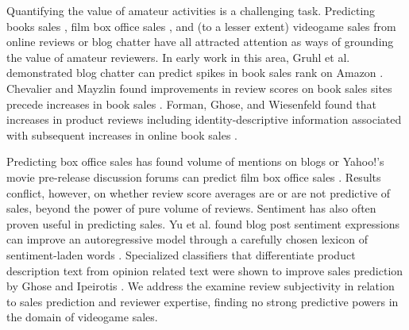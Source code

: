\documentclass{sig-alternate}
\begin{document}
Quantifying the value of amateur activities is a challenging task. 
Predicting books sales \cite{gruhl2005predictive, chevalier2003effect}, film box office sales \cite{dellarocas2007exploring, yu2012mining}, and (to a lesser extent) videogame sales \cite{ehrenfeld2011predicting, marcoux2009hybrid} from online reviews or blog chatter have all attracted attention as ways of grounding the value of amateur reviewers. In early work in this area, Gruhl et al. demonstrated blog chatter can predict spikes in book sales rank on Amazon \cite{gruhl2005predictive}. Chevalier and Mayzlin found improvements in review scores on book sales sites precede increases in book sales \cite{chevalier2003effect}. Forman, Ghose, and Wiesenfeld found that increases in product reviews including identity-descriptive information associated with subsequent increases in online book sales \cite{ghose2007designing}.

Predicting box office sales has found volume of mentions on blogs or Yahoo!'s movie pre-release discussion forums can predict film box office sales \cite{liu2001word, duan2008online}. Results conflict, however, on whether review score averages are \cite{dellarocas2007exploring, hennig-thurau2012movie-reanalysis} or are not \cite{liu2001word, duan2008online} predictive of sales, beyond the power of pure volume of reviews.
Sentiment has also often proven useful in predicting sales. 
Yu et al. found blog post sentiment expressions can improve an autoregressive model through a carefully chosen lexicon of sentiment-laden words \cite{yu2012mining}. 
Specialized classifiers that differentiate product description text from opinion related text were shown to improve sales prediction by Ghose and Ipeirotis \cite{ghose2007designing}. 
We address the examine review subjectivity in relation to sales prediction and reviewer expertise, finding no strong predictive powers in the domain of videogame sales.
\end{document}
